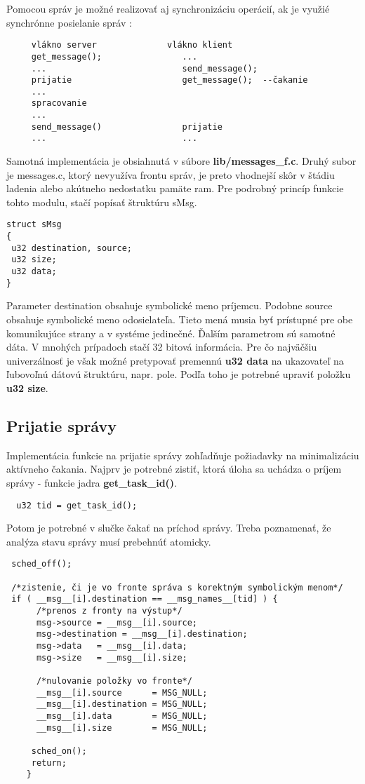 Pomocou správ je možné realizovať aj synchronizáciu operácií, ak je využié synchrónne posielanie správ :
{\small
\begin{verbatim}
     vlákno server              vlákno klient
     get_message();                ...
     ...                           send_message();
     prijatie                      get_message();  --čakanie
     ...                           
     spracovanie   
     ...                
     send_message()                prijatie
     ...                           ...
\end{verbatim}
} 

Samotná implementácia je obsiahnutá v súbore \textbf{lib/messages\_f.c}. Druhý subor je messages.c, ktorý nevyužíva frontu správ, je preto vhodnejší skôr v štádiu ladenia alebo akútneho nedostatku pamäte ram. Pre podrobný princíp funkcie tohto modulu, stačí popísať štruktúru sMsg.
{\small
\begin{verbatim}
struct sMsg
{
 u32 destination, source;
 u32 size;
 u32 data;
}
\end{verbatim}
}

Parameter destination obsahuje symbolické meno príjemcu. Podobne source obsahuje symbolické meno odosielateľa. Tieto mená musia byť prístupné pre obe komunikujúce strany a v systéme jedinečné. Ďalším parametrom sú samotné dáta. V mnohých prípadoch stačí 32 bitová informácia. Pre čo najväčšiu univerzálnosť je však možné pretypovať premennú \textbf{u32 data} na ukazovateľ na ľubovoľnú dátovú štruktúru, napr. pole. Podľa toho je potrebné upraviť položku \textbf{u32 size}.

\subsection {Prijatie správy}
Implementácia funkcie na prijatie správy zohľadňuje požiadavky na minimalizáciu aktívneho čakania. Najprv je potrebné zistiť, ktorá úloha sa uchádza o príjem správy - funkcie jadra \textbf{get\_task\_id()}.

{\small
\begin{verbatim}
  u32 tid = get_task_id();
\end{verbatim}
}
 
Potom je potrebné v slučke čakať na príchod správy. Treba poznamenať, že analýza stavu správy musí prebehnúť atomicky.

{\small
\begin{verbatim}
 sched_off();

 /*zistenie, či je vo fronte správa s korektným symbolickým menom*/
 if ( __msg__[i].destination == __msg_names__[tid] ) {
      /*prenos z fronty na výstup*/
      msg->source = __msg__[i].source;
      msg->destination = __msg__[i].destination;
      msg->data   = __msg__[i].data;
      msg->size   = __msg__[i].size;
  
      /*nulovanie položky vo fronte*/
      __msg__[i].source      = MSG_NULL;
      __msg__[i].destination = MSG_NULL;
      __msg__[i].data        = MSG_NULL;
      __msg__[i].size        = MSG_NULL;

     sched_on();
     return;
    }
\end{verbatim}
}
 
